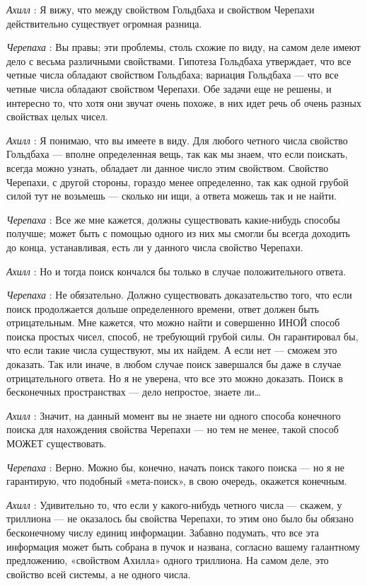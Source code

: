 \documentclass[../main.tex]{subfiles}
\begin{document}
\begin{dialogue}
\emph{Ахилл} : Я вижу, что между свойством Гольдбаха и свойством Черепахи действительно существует огромная разница.

\emph{Черепаха} : Вы правы; эти проблемы, столь схожие по виду, на самом деле имеют дело с весьма различными свойствами. Гипотеза Гольдбаха утверждает, что все четные числа обладают свойством Гольдбаха; вариация Гольдбаха --- что все четные числа обладают свойством Черепахи. Обе задачи еще не решены, и интересно то, что хотя они звучат очень похоже, в них идет речь об очень разных свойствах целых чисел.

\emph{Ахилл} : Я понимаю, что вы имеете в виду. Для любого четного числа свойство Гольдбаха --- вполне определенная вещь, так как мы знаем, что если поискать, всегда можно узнать, обладает ли данное число этим свойством. Свойство Черепахи, с другой стороны, гораздо менее определенно, так как одной грубой силой тут не возьмешь --- сколько ни ищи, а ответа можешь так и не найти.

\emph{Черепаха} : Все же мне кажется, должны существовать какие-нибудь способы получше; может быть с помощью одного из них мы смогли бы всегда доходить до конца, устанавливая, есть ли у данного числа свойство Черепахи.

\emph{Ахилл} : Но и тогда поиск кончался бы только в случае положительного ответа.

\emph{Черепаха} : Не обязательно. Должно существовать доказательство того, что если поиск продолжается дольше определенного времени, ответ должен быть отрицательным. Мне кажется, что можно найти и совершенно ИНОЙ способ поиска простых чисел, способ, не требующий грубой силы. Он гарантировал бы, что если такие числа существуют, мы их найдем. А если нет --- сможем это доказать. Так или иначе, в любом случае поиск завершался бы даже в случае отрицательного ответа. Но я не уверена, что все это можно доказать. Поиск в бесконечных пространствах --- дело непростое, знаете ли\ldots{}

\emph{Ахилл} : Значит, на данный момент вы не знаете ни одного способа конечного поиска для нахождения свойства Черепахи --- но тем не менее, такой способ МОЖЕТ существовать.

\emph{Черепаха} : Верно. Можно бы, конечно, начать поиск такого поиска --- но я не гарантирую, что подобный «мета-поиск», в свою очередь, окажется конечным.

\emph{Ахилл} : Удивительно то, что если у какого-нибудь четного числа --- скажем, у триллиона --- не оказалось бы свойства Черепахи, то этим оно было бы обязано бесконечному числу единиц информации. Забавно подумать, что все эта информация может быть собрана в пучок и названа, согласно вашему галантному предложению, «свойством Ахилла» одного триллиона. На самом деле, это свойство всей системы, а не одного числа.


\end{dialogue}
\end{document}

